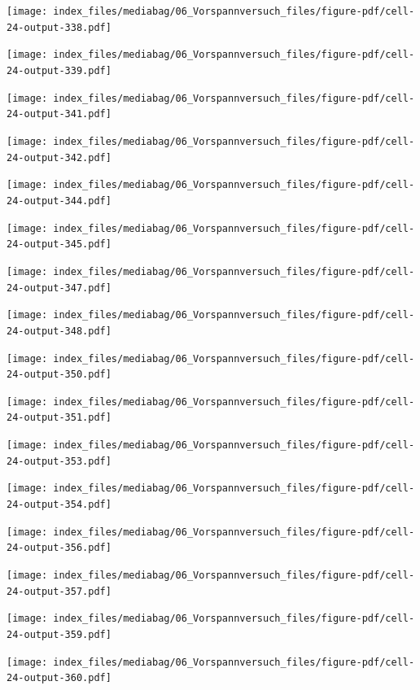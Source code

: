 \documentclass[
  11pt,
  letterpaper,
]{scrreprt}
\begin{document}
\newpage{}

\texttt{[image: index\_files/mediabag/06\_Vorspannversuch\_files/figure-pdf/cell-24-output-338.pdf]}

\texttt{[image: index\_files/mediabag/06\_Vorspannversuch\_files/figure-pdf/cell-24-output-339.pdf]}

\newpage{}

\texttt{[image: index\_files/mediabag/06\_Vorspannversuch\_files/figure-pdf/cell-24-output-341.pdf]}

\texttt{[image: index\_files/mediabag/06\_Vorspannversuch\_files/figure-pdf/cell-24-output-342.pdf]}

\newpage{}

\texttt{[image: index\_files/mediabag/06\_Vorspannversuch\_files/figure-pdf/cell-24-output-344.pdf]}

\texttt{[image: index\_files/mediabag/06\_Vorspannversuch\_files/figure-pdf/cell-24-output-345.pdf]}

\newpage{}

\texttt{[image: index\_files/mediabag/06\_Vorspannversuch\_files/figure-pdf/cell-24-output-347.pdf]}

\texttt{[image: index\_files/mediabag/06\_Vorspannversuch\_files/figure-pdf/cell-24-output-348.pdf]}

\newpage{}

\texttt{[image: index\_files/mediabag/06\_Vorspannversuch\_files/figure-pdf/cell-24-output-350.pdf]}

\texttt{[image: index\_files/mediabag/06\_Vorspannversuch\_files/figure-pdf/cell-24-output-351.pdf]}

\newpage{}

\texttt{[image: index\_files/mediabag/06\_Vorspannversuch\_files/figure-pdf/cell-24-output-353.pdf]}

\texttt{[image: index\_files/mediabag/06\_Vorspannversuch\_files/figure-pdf/cell-24-output-354.pdf]}

\newpage{}

\texttt{[image: index\_files/mediabag/06\_Vorspannversuch\_files/figure-pdf/cell-24-output-356.pdf]}

\texttt{[image: index\_files/mediabag/06\_Vorspannversuch\_files/figure-pdf/cell-24-output-357.pdf]}

\newpage{}

\texttt{[image: index\_files/mediabag/06\_Vorspannversuch\_files/figure-pdf/cell-24-output-359.pdf]}

\texttt{[image: index\_files/mediabag/06\_Vorspannversuch\_files/figure-pdf/cell-24-output-360.pdf]}
\end{document}
